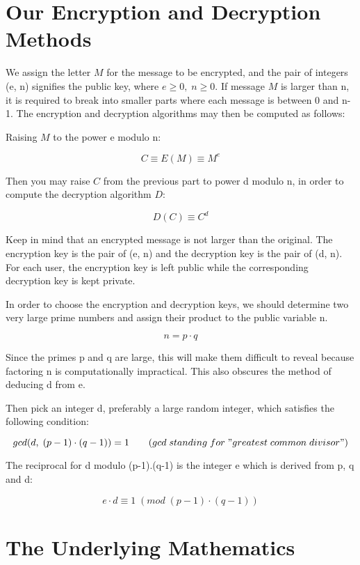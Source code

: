 \documentclass[12pt, letterpaper]{article}
\begin{document}
\section{Our Encryption and Decryption Methods}

We assign the letter $M$ for the message to be encrypted, and the pair of integers (e, n) signifies the public key, where $e \geq 0, \; n \geq 0$. If message $M$ is larger than n, it is required to break into smaller parts where each message is between 0 and n-1. The encryption and decryption algorithms may then be computed as follows:

Raising $M$ to the power e modulo n:

\[ C \equiv E(M) \equiv M^e \]

Then you may raise $C$ from the previous part to power d modulo n, in order to compute the decryption algorithm $D$:
	
\[ D(C) \equiv C^d \] 

Keep in mind that an encrypted message is not larger than the original. The encryption key is the pair of (e, n) and the decryption key is the pair of (d, n). For each user, the encryption key is left public while the corresponding decryption key is kept private. 

In order to choose the encryption and decryption keys, we should determine two very large prime numbers and assign their product to the public variable n. 

\[ n = p \cdot q \]

Since the primes p and q are large, this will make them difficult to reveal because factoring n is computationally impractical. This also obscures the method of deducing d from e.

Then pick an integer d, preferably a large random integer, which satisfies the following condition:

\[ gcd(d, \; (p-1) \cdot (q-1)) = 1  \qquad (gcd \; standing \; for \; "greatest \; common \; divisor") \]
	
The reciprocal for d modulo (p-1).(q-1) is the integer e which is derived from p, q and d:

\begin{equation}
e \cdot d \equiv 1 \; (mod \; (p-1) \cdot (q-1))
\end{equation}

\section{The Underlying Mathematics}
\end{document}
